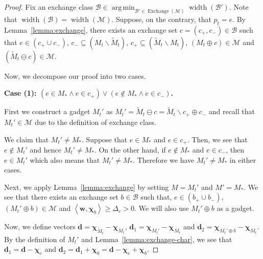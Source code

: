 \documentclass{article}
\newcommand{\M}{\mathcal M}
\newcommand{\B}{\mathcal B}
\newcommand{\del}{\backslash}
\DeclareMathOperator{\rank}{width}
\DeclareMathOperator*{\argmin}{arg\,min}
\DeclareMathOperator{\Exchange}{Exchange}
\newcommand{\inn}[1]{\left\langle #1 \right\rangle}
\renewcommand{\vec}[1]{\boldsymbol{#1}}
\begin{document}
\begin{proof}
Fix an exchange class $\B\in \argmin_{\B'\in \Exchange(\M)} \rank(\B')$.
Note that $\rank(\B) = \rank(\M)$.
Suppose, on the contrary, that $p_t = e$.
By Lemma~\ref{lemma:exchange}, there exists an exchange set $c=(c_+,c_-) \in \B$
such that $e\in (c_+\cup c_-)$, $c_- \subseteq (M_t \del \tilde M_t)$, $c_+ \subseteq (\tilde M_t \del M_t)$, $(M_t\oplus c) \in \M$ and $(\tilde M_t \ominus c) \in \M$.


Now, we decompose our proof into two cases.

\textbf{Case (1): $(e \in M_* \wedge e\in c_+) \vee (e \not \in M_* \wedge e\in c_-)$.}

First we construct a gadget $M_t'$ as $M_t' = \tilde M_t \ominus c = \tilde M_t \del c_+ \oplus c_-$ and recall that $M_t' \in \M$ due to the definition of exchange class.

We claim that $M_t'\not= M_*$.
Suppose that $e\in M_*$ and $e\in c_+$.
Then, we see that $e\not\in M_t'$ and hence $M_t'\not=M_*$.
On the other hand, if $e\not \in M_*$ and $e\in c_-$, then $e\in M_t'$ which also means that $M_t'\not= M_*$.
Therefore we have $M_t'\not=M_*$ in either cases.


Next, we apply Lemma~\ref{lemma:exchange} by setting $M=M_t'$ and $M'=M_*$.
We see that there exists an exchange set $b\in \B$ such that, $e\in (b_+\cup b_-)$, $(M_t' \oplus b) \in \M$ and
 $\inn{\vec w, \vec \chi_b} \ge \Delta_e > 0$.
We will also use $M_t'\oplus b$ as a gadget.

Now, we define vectors $\vec d = \vec \chi_{\tilde M_t} - \vec \chi_{M_t}$, $\vec d_1 = \vec\chi_{M_t'}-\vec\chi_{M_t}$ and $\vec d_2 = \vec\chi_{M_t'\oplus b}-\vec\chi_{M_t}$.
By the definition of $M_t'$ and Lemma~\ref{lemma:exchange-char}, we see that $\vec d_1 = \vec d - \vec \chi_{c}$ and $\vec d_2 = \vec d_1+\vec \chi_b = \vec d-\vec \chi_c+\vec \chi_b$.



\end{proof}
\end{document}
